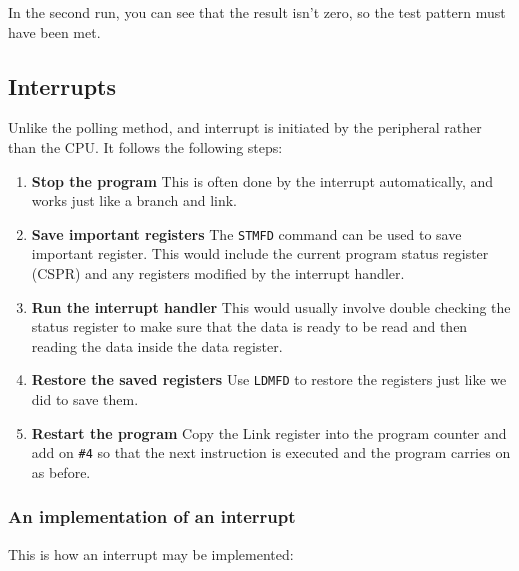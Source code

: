 In the second run, you can see that the result isn't zero, so the test pattern
must have been met.

\subsection{Interrupts}

Unlike the polling method, and interrupt is initiated by the peripheral rather
than the CPU. It follows the following steps:

\begin{enumerate}
	\item {\bf Stop the program}
			This is often done by the interrupt automatically, and works just
			like a branch and link.
	\item {\bf Save important registers}
			The {\tt STMFD} command can be used to save important register.
			This would include the current program status register (CSPR) and
			any registers modified by the interrupt handler.
	\item {\bf Run the interrupt handler}
			This would usually involve double checking the status register to
			make sure that the data is ready to be read and then reading the
			data inside the data register.
	\item {\bf Restore the saved registers}
			Use {\tt LDMFD} to restore the registers just like we did to save
			them.
	\item {\bf Restart the program}
			Copy the Link register into the program counter and add on {\tt \#4}
			so that the next instruction is executed and the program carries on
			as before.
\end{enumerate}

\subsubsection{An implementation of an interrupt}

This is how an interrupt may be implemented:

